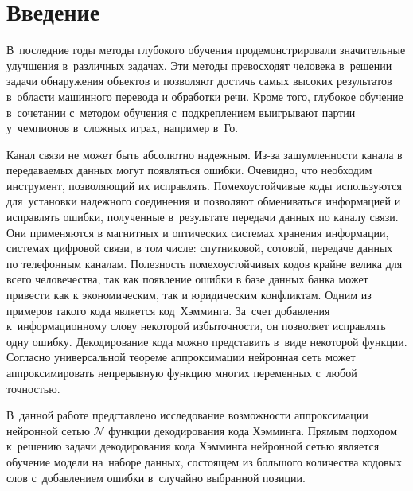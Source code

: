 \section{Введение}

В~последние годы методы глубокого обучения продемонстрировали значительные улучшения в~различных задачах\cite{bib:buhrstein}. Эти методы превосходят человека в~решении задачи обнаружения объектов и позволяют достичь самых высоких результатов в~области машинного перевода и обработки речи. Кроме того, глубокое обучение в~сочетании с~методом обучения с~подкреплением выигрывают партии у~чемпионов в~сложных играх, например в~Го\cite[c.\,484–489]{bib:win_go}.

Канал связи не может быть абсолютно надежным. Из-за зашумленности канала в передаваемых данных могут появляться ошибки. Очевидно, что необходим инструмент, позволяющий их исправлять. Помехоустойчивые коды\cite[с.\,4]{bib:codes} используются для~установки надежного соединения и позволяют обмениваться информацией и исправлять ошибки, полученные в~результате передачи данных по каналу связи. Они применяются в магнитных и оптических системах хранения информации, системах цифровой связи, в том числе: спутниковой, сотовой, передаче данных по телефонным каналам. Полезность помехоустойчивых кодов крайне велика для всего человечества, так как появление ошибки в базе данных банка может привести как к экономическим, так и юридическим конфликтам. Одним из примеров такого кода является код~Хэмминга\cite[с.\,49]{bib:codes2}. За~счет добавления к~информационному слову некоторой избыточности, он позволяет исправлять одну ошибку. Декодирование\cite[c.\,5]{bib:codes} кода можно представить в~виде некоторой функции. Согласно универсальной теореме аппроксимации\cite{bib:approximation_theorem} нейронная сеть\cite[с.\,23]{bib:neural_networks} может аппроксимировать непрерывную функцию многих переменных с~любой точностью.

В~данной работе представлено исследование возможности аппроксимации нейронной сетью $\mathcal{N}$ функции декодирования кода Хэмминга. Прямым подходом к~решению задачи декодирования кода Хэмминга нейронной сетью является обучение модели на~наборе данных, состоящем из большого количества кодовых слов с~добавлением ошибки в~случайно выбранной позиции.


\newpage 